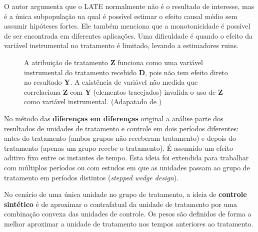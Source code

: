 \documentclass[final,5p]{elsarticle}
\numberwithin{equation}{section}
\begin{document}
    O autor argumenta que o LATE normalmente não é o resultado de interesse, mas é a única subpopulação na qual é possível estimar o efeito causal médio sem assumir hipóteses fortes. Ele também menciona que a monotonicidade é possível de ser encontrada em diferentes aplicações. Uma dificuldade é quando o efeito da variável instrumental no tratamento é limitado, levando a estimadores ruins.

    \begin{figure}[hbt!]
        \centering
        \caption{A atribuição de tratamento \textbf{Z} funciona como uma variável instrumental do tratamento recebido \textbf{D}, pois não tem efeito direto no resultado \textbf{Y}. A existência de variável não medida que correlaciona \textbf{Z} com \textbf{Y} (elementos tracejados) invalida o uso de \textbf{Z} como variável instrumental. (Adapatado de \cite{imbens2024causal})}
        \label{fig:diagrama_variavel_instrumental}
    \end{figure}

    No método das \textbf{diferenças em diferenças} original a análise parte dos resultados de unidades de tratamento e controle em dois períodos diferentes: antes do tratamento (ambos grupos não receberam tratamento) e depois do tratamento (apenas um grupo recebe o tratamento). É assumido um efeito aditivo fixo entre os instantes de tempo. Esta ideia foi extendida para trabalhar com múltiplos períodos ou com estudos em que as unidades passam ao grupo de tratamento em períodos distintos (\textit{stepped wedge design}).

    No cenário de uma única unidade no grupo de tratamento, a ideia de \textbf{controle sintético} é de aproximar o contrafatual da unidade de tratamento por uma combinação convexa das unidades de controle. Os pesos são definidos de forma a melhor aproximar a unidade de tratamento nos tempos anteriores ao tratamento.
\end{document}
